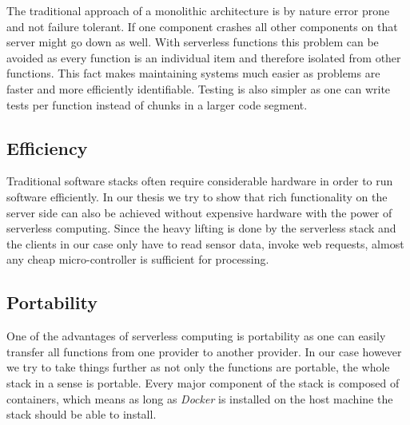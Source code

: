The traditional approach of a monolithic architecture is by nature error prone and not failure
tolerant. If one component crashes all other components on that server might go down as well. With
serverless functions this problem can be avoided as every function is an individual item and
therefore isolated from other functions. This fact makes maintaining systems much easier as problems
are faster and more efficiently identifiable. Testing is also simpler as one can write tests per
function instead of chunks in a larger code segment.

\subsection{Efficiency}

Traditional software stacks often require considerable hardware in order to run software
efficiently. In our thesis we try to show that rich functionality on the server side can also be
achieved without expensive hardware with the power of serverless computing. Since the heavy lifting
is done by the serverless stack and the clients in our case only have to read sensor data, invoke
web requests, almost any cheap micro-controller is sufficient for processing.

\subsection{Portability}

One of the advantages of serverless computing is portability as one can easily transfer all
functions from one provider to another provider. In our case however we try to take things further as
not only the functions are portable, the whole stack in a sense is portable. Every major component
of the stack is composed of containers, which means as long as \textit{Docker} is installed on the
host machine the stack should be able to install.
